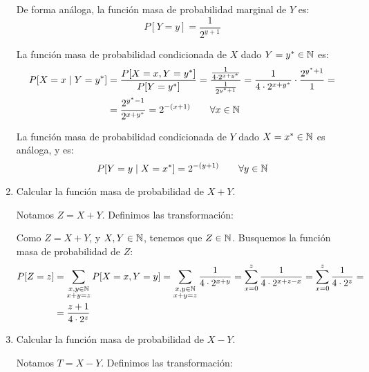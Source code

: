\begin{ejercicio}
\begin{enumerate}
        De forma análoga, la función masa de probabilidad marginal de $Y$ es:
        \begin{equation*}
            P[Y=y]=\dfrac{1}{2^{y+1}}
        \end{equation*}

        La función masa de probabilidad condicionada de $X$ dado $Y=y^*\in \mathbb{N}$ es:
        \begin{align*}
            P[X=x\mid Y=y^*]&=\dfrac{P[X=x,Y=y^*]}{P[Y=y^*]}
            = \dfrac{\frac{1}{4\cdot 2^{x+y^*}}}{\frac{1}{2^{y^*+1}}}
            = \dfrac{1}{4\cdot 2^{x+y^*}}\cdot \dfrac{2^{y^*+1}}{1}
            =\\&= \dfrac{2^{y^*-1}}{2^{x+y^*}}
            = 2^{-(x+1)} \qquad \forall x\in\mathbb{N}
        \end{align*}

        La función masa de probabilidad condicionada de $Y$ dado $X=x^*\in \mathbb{N}$ es análoga, y es:
        \begin{equation*}
            P[Y=y\mid X=x^*]=2^{-(y+1)} \qquad \forall y\in\mathbb{N}
        \end{equation*}
        \item Calcular la función masa de probabilidad de $X+Y$.
        
        Notamos $Z=X+Y$. Definimos las transformación:
        
        Como $Z=X+Y$, y $X,Y\in\mathbb{N}$, tenemos que $Z\in\mathbb{N}$. Busquemos la función masa de probabilidad de $Z$:
        \begin{align*}
            P[Z=z]&=\sum_{\substack{x,y\in\mathbb{N} \\ x+y=z}} P[X=x,Y=y]
            = \sum_{\substack{x,y\in\mathbb{N} \\ x+y=z}} \dfrac{1}{4\cdot 2^{x+y}}
            = \sum_{x=0}^{z}\dfrac{1}{4\cdot 2^{x+z-x}}
            = \sum_{x=0}^{z}\dfrac{1}{4\cdot 2^{z}}
            =\\&=\dfrac{z+1}{4\cdot 2^z}
        \end{align*}
        
        \item Calcular la función masa de probabilidad de $X-Y$.
        
        Notamos $T=X-Y$. Definimos las transformación:


\end{enumerate}
\end{ejercicio}
